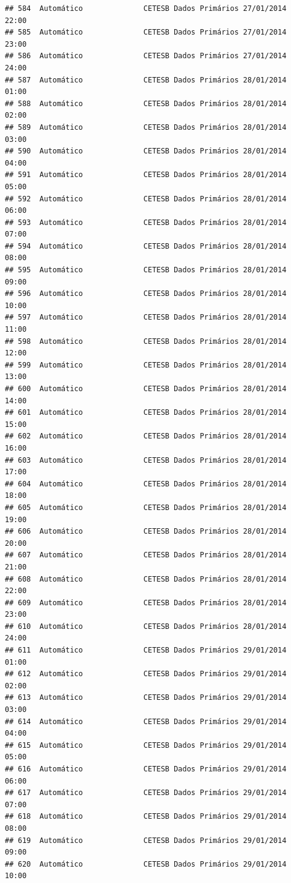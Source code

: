 \documentclass[]{book}
\begin{document}
\begin{verbatim}
## 584  Automático              CETESB Dados Primários 27/01/2014 22:00
## 585  Automático              CETESB Dados Primários 27/01/2014 23:00
## 586  Automático              CETESB Dados Primários 27/01/2014 24:00
## 587  Automático              CETESB Dados Primários 28/01/2014 01:00
## 588  Automático              CETESB Dados Primários 28/01/2014 02:00
## 589  Automático              CETESB Dados Primários 28/01/2014 03:00
## 590  Automático              CETESB Dados Primários 28/01/2014 04:00
## 591  Automático              CETESB Dados Primários 28/01/2014 05:00
## 592  Automático              CETESB Dados Primários 28/01/2014 06:00
## 593  Automático              CETESB Dados Primários 28/01/2014 07:00
## 594  Automático              CETESB Dados Primários 28/01/2014 08:00
## 595  Automático              CETESB Dados Primários 28/01/2014 09:00
## 596  Automático              CETESB Dados Primários 28/01/2014 10:00
## 597  Automático              CETESB Dados Primários 28/01/2014 11:00
## 598  Automático              CETESB Dados Primários 28/01/2014 12:00
## 599  Automático              CETESB Dados Primários 28/01/2014 13:00
## 600  Automático              CETESB Dados Primários 28/01/2014 14:00
## 601  Automático              CETESB Dados Primários 28/01/2014 15:00
## 602  Automático              CETESB Dados Primários 28/01/2014 16:00
## 603  Automático              CETESB Dados Primários 28/01/2014 17:00
## 604  Automático              CETESB Dados Primários 28/01/2014 18:00
## 605  Automático              CETESB Dados Primários 28/01/2014 19:00
## 606  Automático              CETESB Dados Primários 28/01/2014 20:00
## 607  Automático              CETESB Dados Primários 28/01/2014 21:00
## 608  Automático              CETESB Dados Primários 28/01/2014 22:00
## 609  Automático              CETESB Dados Primários 28/01/2014 23:00
## 610  Automático              CETESB Dados Primários 28/01/2014 24:00
## 611  Automático              CETESB Dados Primários 29/01/2014 01:00
## 612  Automático              CETESB Dados Primários 29/01/2014 02:00
## 613  Automático              CETESB Dados Primários 29/01/2014 03:00
## 614  Automático              CETESB Dados Primários 29/01/2014 04:00
## 615  Automático              CETESB Dados Primários 29/01/2014 05:00
## 616  Automático              CETESB Dados Primários 29/01/2014 06:00
## 617  Automático              CETESB Dados Primários 29/01/2014 07:00
## 618  Automático              CETESB Dados Primários 29/01/2014 08:00
## 619  Automático              CETESB Dados Primários 29/01/2014 09:00
## 620  Automático              CETESB Dados Primários 29/01/2014 10:00

\end{verbatim}
\end{document}
